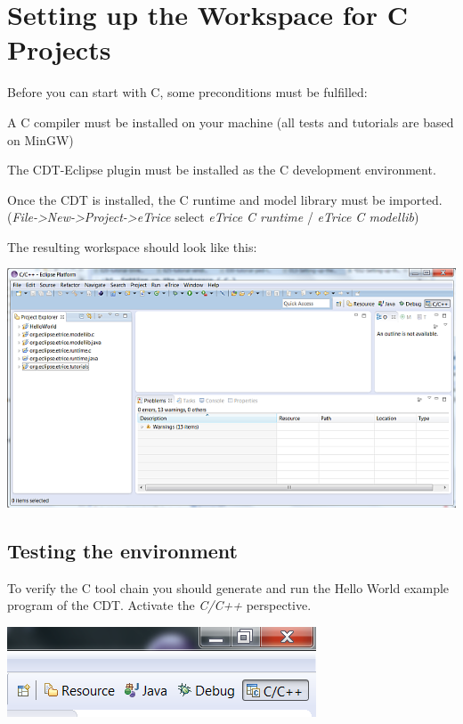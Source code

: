 \chapter{Setting up the Workspace for C Projects}
 
Before you can start with C, some preconditions must be fulfilled:

\begin{description}
\item{A C compiler} must be installed on your machine (all tests and tutorials are based on MinGW)
\item{The CDT-Eclipse plugin} must be installed as the C development environment.
\end{description}

Once the CDT is installed, the C runtime and model library must be imported. 
(\textit{File->New->Project->eTrice} select \textit{eTrice C runtime} / \textit{eTrice C modellib})

The resulting workspace should look like this:

\includegraphics{images/032-SetupWorkspaceC01.png}


\section{Testing the environment}

To verify the C tool chain you should generate and run the Hello World example program of the CDT. Activate the \textit{C/C++} perspective. 

\includegraphics{images/032-SetupWorkspaceC03.png} 
 
